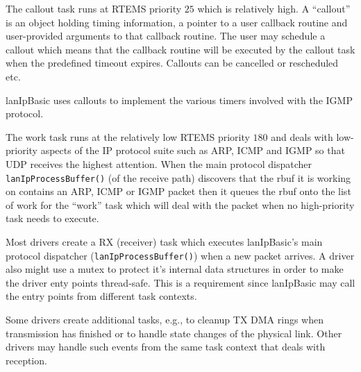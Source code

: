 \documentclass{article}
\newcommand{\lip}{lanIpBasic}
\newcommand{\rbuf}{{rbuf}}
\newcommand{\cmd}[1]{{\tt #1}}
\begin{document}
The callout task runs at RTEMS priority $25$ which is relatively
high. A ``callout'' is an object holding timing information, a 
pointer to a user callback routine and user-provided arguments
to that callback routine. The user may schedule a callout which
means that the callback routine will be executed by the callout
task when the predefined timeout expires. Callouts can be
cancelled or rescheduled etc.

\lip{} uses callouts to implement the various timers involved
with the IGMP protocol.

The work task runs at the relatively low RTEMS priority $180$
and deals with low-priority aspects of the IP protocol suite
such as ARP, ICMP and IGMP so that UDP receives the highest
attention. When the main protocol dispatcher \cmd{lanIpProcessBuffer()}
(of the receive path) discovers that the \rbuf{} it is working on 
contains an ARP, ICMP or IGMP packet then it queues the \rbuf{}
onto the list of work for the ``work'' task which will deal
with the packet when no high-priority task needs to execute.

Most drivers create a RX (receiver) task which executes
\lip{}'s main protocol dispatcher (\cmd{lanIpProcessBuffer()}) when
a new packet arrives. A driver also might use a mutex to
protect it's internal data structures in order to make
the driver enty points thread-safe. This is a requirement
since \lip{} may call the entry points from different
task contexts.

Some drivers create additional tasks, e.g., to cleanup
TX DMA rings when transmission has finished or to handle
state changes of the physical link. Other drivers may
handle such events from the same task context that deals
with reception.
\end{document}

